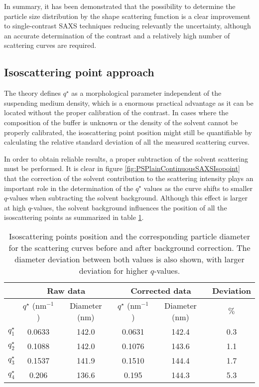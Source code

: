 In summary, it has been demonstrated that the possibility to determine the particle size distribution by the shape scattering function is a clear improvement to single-contrast SAXS techniques reducing relevantly the uncertainty, although an accurate determination of the contrast and a relatively high number of scattering curves are required. 

\subsection{Isoscattering point approach}

The theory defines $q^{\star}$ as a morphological parameter independent of the suspending medium density, which is a enormous practical advantage as it can be located without the proper calibration of the contrast. In cases where the composition of the buffer is unknown or the density of the solvent cannot be properly calibrated, the isoscattering point position might still be quantifiable by calculating the relative standard deviation of all the measured scattering curves. 

In order to obtain reliable results, a proper subtraction of the solvent scattering must be performed. It is clear in figure \ref{fig:PSPlainContinuousSAXSIsopoint} that the correction of the solvent contribution to the scattering intensity plays an important role in the determination of the $q^{\star}$ values as the curve shifts to smaller $q$-values when subtracting the solvent background. Although this effect is larger at high $q$-values, the solvent background influences the position of all the isoscattering points as summarized in table \ref{tab:isoscattering_points}. 

\begin{table}
	\centering
	\begin{tabular}{l||cc|cc|c}
		 & \multicolumn{2}{c}{Raw data} & \multicolumn{2}{c}{Corrected data} & Deviation\\
		 \hline
		 & \( q^{\star} \) (nm\(^{-1}\))    &  Diameter (nm) & \( q^{\star}\) (nm\(^{-1}\))    &  Diameter (nm) & $\%$ \\
		\hline
		 \(q^{\star}_1\) &  0.0633 & 142.0 &  0.0631 & 142.4 & 0.3 \\
		 \(q^{\star}_2\) &  0.1088 & 142.0 &  0.1076 & 143.6 & 1.1   \\
		 \(q^{\star}_3\) &  0.1537 & 141.9 &  0.1510 & 144.4 & 1.7    \\
		 \(q^{\star}_4\) &  0.206  & 136.6 &  0.195  & 144.3 & 5.3     \\
		\end{tabular}
	\caption[Isoscattering points position and the corresponding particle diameter.]{Isoscattering points position and the corresponding particle diameter for the scattering curves before and after background correction. The diameter deviation between both values is also shown, with larger deviation for higher $q$-values.}
	\label{tab:isoscattering_points}
\end{table}


